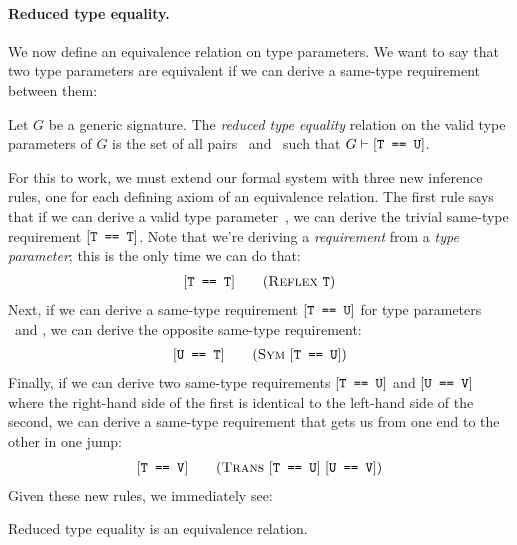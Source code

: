 \documentclass[../generics]{subfiles}
\begin{document}
\paragraph{Reduced type equality.} We now define an equivalence relation on type parameters. We want to say that two type parameters are equivalent if we can derive a same-type requirement between them:

\begin{definition}
Let $G$ be a generic signature. The \emph{reduced type equality} relation on the valid type parameters of $G$ is the set of all pairs \tT\ and \tU\ such that $G\vdash[\texttt{T == U}]$.
\end{definition}

For this to work, we must extend our formal system with three new inference rules, one for each defining axiom of an equivalence relation. The first rule says that if we can derive a valid type parameter~\tT, we can derive the trivial same-type requirement $[\texttt{T == T}]$. Note that we're deriving a \emph{requirement} from a \emph{type parameter}; this is the only time we can do that:
\begin{gather*}
\ReflexStepDef
\end{gather*}
Next, if we can derive a same-type requirement $[\texttt{T == U}]$ for type parameters \tT\ and \tU, we can derive the opposite same-type requirement:
\begin{gather*}
\SymStepDef
\end{gather*}
Finally, if we can derive two same-type requirements $[\texttt{T == U}]$ and $[\texttt{U == V}]$ where the right-hand side of the first is identical to the left-hand side of the second, we can derive a same-type requirement that gets us from one end to the other in one jump:
\begin{gather*}
\TransStepDef
\end{gather*}
Given these new rules, we immediately see:
\begin{proposition}
Reduced type equality is an equivalence relation.
\end{proposition}
\end{document}
